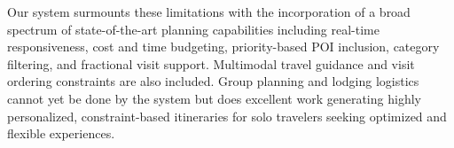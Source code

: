 Our system surmounts these limitations with the incorporation of a broad spectrum of state-of-the-art planning capabilities including real-time responsiveness, cost and time budgeting, priority-based POI inclusion, category filtering, and fractional visit support. Multimodal travel guidance and visit ordering constraints are also included. Group planning and lodging logistics cannot yet be done by the system but does excellent work generating highly personalized, constraint-based itineraries for solo travelers seeking optimized and flexible experiences.